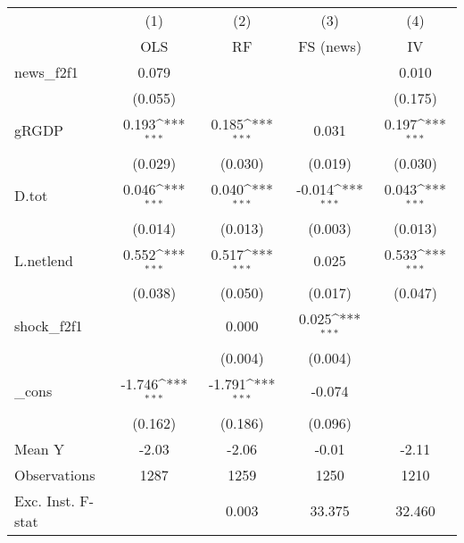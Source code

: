 {
\def\sym#1{\ifmmode^{#1}\else\(^{#1}\)\fi}
\begin{tabular}{l*{4}{c}}
\toprule
            &\multicolumn{1}{c}{(1)}&\multicolumn{1}{c}{(2)}&\multicolumn{1}{c}{(3)}&\multicolumn{1}{c}{(4)}\\
            &\multicolumn{1}{c}{OLS}&\multicolumn{1}{c}{RF}&\multicolumn{1}{c}{FS (news)}&\multicolumn{1}{c}{IV}\\
\midrule
news\_f2f1   &       0.079         &                     &                     &       0.010         \\
            &     (0.055)         &                     &                     &     (0.175)         \\
\addlinespace
gRGDP       &       0.193\sym{***}&       0.185\sym{***}&       0.031         &       0.197\sym{***}\\
            &     (0.029)         &     (0.030)         &     (0.019)         &     (0.030)         \\
\addlinespace
D.tot       &       0.046\sym{***}&       0.040\sym{***}&      -0.014\sym{***}&       0.043\sym{***}\\
            &     (0.014)         &     (0.013)         &     (0.003)         &     (0.013)         \\
\addlinespace
L.netlend   &       0.552\sym{***}&       0.517\sym{***}&       0.025         &       0.533\sym{***}\\
            &     (0.038)         &     (0.050)         &     (0.017)         &     (0.047)         \\
\addlinespace
shock\_f2f1  &                     &       0.000         &       0.025\sym{***}&                     \\
            &                     &     (0.004)         &     (0.004)         &                     \\
\addlinespace
\_cons      &      -1.746\sym{***}&      -1.791\sym{***}&      -0.074         &                     \\
            &     (0.162)         &     (0.186)         &     (0.096)         &                     \\
\midrule
Mean Y      &       -2.03         &       -2.06         &       -0.01         &       -2.11         \\
Observations&        1287         &        1259         &        1250         &        1210         \\
Exc. Inst. F-stat&                     &       0.003         &      33.375         &      32.460         \\
\bottomrule
\end{tabular}
}
